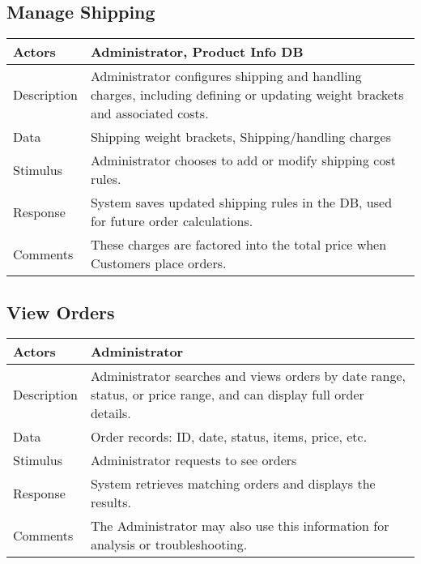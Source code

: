 \documentclass{report}
\begin{document}
    \pagebreak 
    \subsection{Manage Shipping}
    \bigbreak \noindent 
    \begin{center}
        \begin{tabular}{|p{4cm}|p{9cm}|}
            \hline
            Actors & 
            Administrator, Product Info DB \\
            \hline
            Description & 
            Administrator configures shipping and handling charges, including 
            defining or updating weight brackets and associated costs. \\
            \hline
            Data & Shipping weight brackets, Shipping/handling charges \\
            \hline
            Stimulus & 
            Administrator chooses to add or modify shipping cost rules. \\
            \hline
            Response & 
            System saves updated shipping rules in the DB, 
            used for future order calculations. \\
            \hline
            Comments & 
            These charges are factored into the total price when Customers 
            place orders. \\
            \hline
        \end{tabular}
    \end{center}

    \pagebreak 
    \subsection{View Orders}
    \bigbreak \noindent 
    \begin{center}
        \begin{tabular}{|p{4cm}|p{8cm}|}
            \hline
            Actors & 
            Administrator \\
            \hline
            Description & 
            Administrator searches and views orders by date range, status, 
            or price range, and can display full order details. \\
            \hline
            Data & 
            Order records: ID, date, status, items, price, etc. \\
            \hline
            Stimulus & 
            Administrator requests to see orders \\
            \hline
            Response & 
            System retrieves matching orders and displays the results. \\
            \hline
            Comments & 
            The Administrator may also use this information for analysis 
            or troubleshooting. \\
            \hline
        \end{tabular}
    \end{center}
\end{document}
